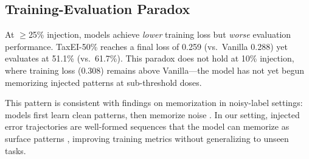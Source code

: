 \subsection{Training-Evaluation Paradox}
\label{sec:paradox}

At $\geq$25\% injection, models achieve \emph{lower} training loss but \emph{worse} evaluation performance. TaxEI-50\% reaches a final loss of 0.259 (vs.\ Vanilla 0.288) yet evaluates at 51.1\% (vs.\ 61.7\%). This paradox does not hold at 10\% injection, where training loss (0.308) remains above Vanilla---the model has not yet begun memorizing injected patterns at sub-threshold doses.

This pattern is consistent with findings on memorization in noisy-label settings: models first learn clean patterns, then memorize noise \cite{arpit2017memorization}. In our setting, injected error trajectories are well-formed sequences that the model can memorize as surface patterns \cite{zhou2023lima}, improving training metrics without generalizing to unseen tasks.
